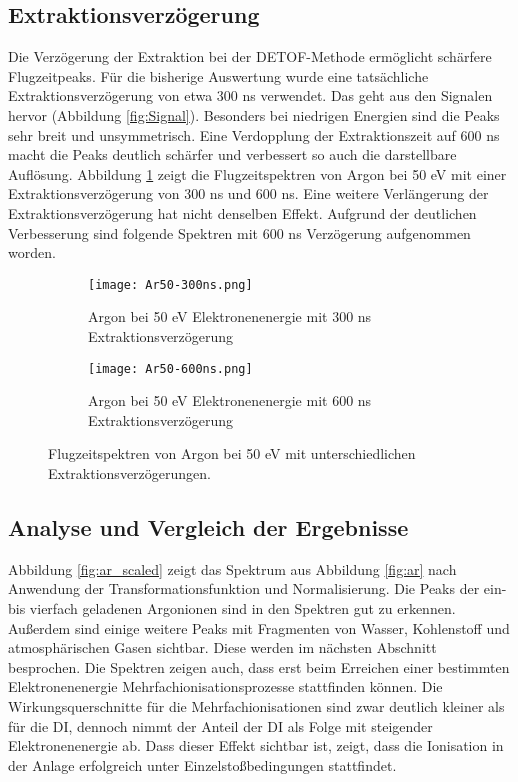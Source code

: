 \subsection{Extraktionsverzögerung}
Die Verzögerung der Extraktion bei der DETOF-Methode ermöglicht schärfere Flugzeitpeaks. Für die bisherige Auswertung wurde eine tatsächliche Extraktionsverzögerung von etwa 300 ns verwendet. Das geht aus den Signalen hervor (Abbildung \ref{fig:Signal}). Besonders bei niedrigen Energien sind die Peaks sehr breit und unsymmetrisch. Eine Verdopplung der Extraktionszeit auf 600 ns macht die Peaks deutlich schärfer und verbessert so auch die darstellbare Auflösung. Abbildung \ref{fig:delay} zeigt die Flugzeitspektren von Argon bei 50 eV mit einer Extraktionsverzögerung von 300 ns und 600 ns. Eine weitere Verlängerung der Extraktionsverzögerung hat nicht denselben Effekt. Aufgrund der deutlichen Verbesserung sind folgende Spektren mit 600 ns Verzögerung aufgenommen worden.
\begin{figure}
    \centering
    \begin{subfigure}{.8\textwidth}
        \centering
        \texttt{[image: Ar50-300ns.png]}
        \caption{Argon bei 50 eV Elektronenenergie mit 300 ns Extraktionsverzögerung}
    \end{subfigure}%
    \hfill
    \begin{subfigure}{.8\textwidth}
        \centering
        \texttt{[image: Ar50-600ns.png]}
        \caption{Argon bei 50 eV Elektronenenergie mit 600 ns Extraktionsverzögerung}
        
    \end{subfigure}
    \caption[Einfluss der Extraktionsverzögerung auf Flugzeitspektren]{Flugzeitspektren von Argon bei 50 eV mit unterschiedlichen Extraktionsverzögerungen.}
    \label{fig:delay}
\end{figure}

\subsection{Analyse und Vergleich der Ergebnisse}
Abbildung \ref{fig:ar_scaled} zeigt das Spektrum aus Abbildung \ref{fig:ar} nach Anwendung der Transformationsfunktion und Normalisierung. Die Peaks der ein- bis vierfach geladenen Argonionen sind in den Spektren gut zu erkennen. Außerdem sind einige weitere Peaks mit Fragmenten von Wasser, Kohlenstoff und atmosphärischen Gasen sichtbar. Diese werden im nächsten Abschnitt besprochen. Die Spektren zeigen auch, dass erst beim Erreichen einer bestimmten Elektronenenergie Mehrfachionisationsprozesse stattfinden können. Die Wirkungsquerschnitte für die Mehrfachionisationen sind zwar deutlich kleiner als für die DI, dennoch nimmt der Anteil der DI als Folge mit steigender Elektronenenergie ab. Dass dieser Effekt sichtbar ist, zeigt, dass die Ionisation in der Anlage erfolgreich unter Einzelstoßbedingungen stattfindet. 


